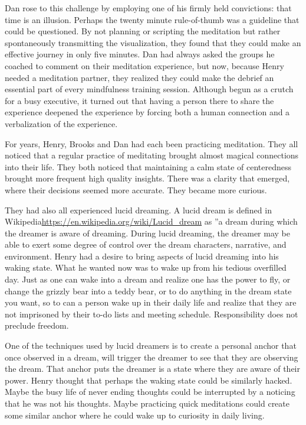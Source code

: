 \documentclass[12pt]{book}
\begin{document}
Dan rose to this challenge by employing one of his firmly held convictions: that time is an illusion. Perhaps the twenty minute rule-of-thumb was a guideline that could be questioned. By not planning or scripting the meditation but rather spontaneously transmitting the visualization, they found that they could make an effective journey in only five minutes. Dan had always asked the groups he coached to comment on their meditation experience, but now, because Henry needed a meditation partner, they realized they could make the debrief an essential part of every mindfulness training session. Although begun as a crutch for a busy executive, it turned out that having a person there to share the experience deepened the experience by forcing both a human connection and a verbalization of the experience.
					
For years,  Henry, Brooks and Dan had each been practicing meditation. They all noticed that a regular practice of meditating brought almost magical connections into their life. They both noticed that maintaining a calm state of centeredness brought more frequent high quality insights. There was a clarity that emerged, where their decisions seemed more accurate. They became more curious.

					
They had also all  experienced lucid dreaming. A lucid dream is defined in Wikipedia\url{https://en.wikipedia.org/wiki/Lucid_dream} as ”a dream during which the dreamer is aware of dreaming. During lucid dreaming, the dreamer may be able to exert some degree of control over the dream characters, narrative, and environment. Henry had a desire to bring aspects of lucid dreaming into his waking state. What he wanted now was to wake up from his tedious overfilled day. Just as one can wake into a dream and realize one has the power to fly, or change the grizzly bear into a teddy bear, or to do anything in the dream state you want, so to can a person wake up in their daily life and realize that they are not imprisoned by their to-do lists and meeting schedule. Responsibility does not preclude freedom.
					
One of the techniques used by lucid dreamers is to create a personal anchor that once observed in a dream, will trigger the dreamer to see that they are observing the dream. That anchor puts the dreamer is a state where they are aware of their power. Henry thought that perhaps the waking state could be similarly hacked. Maybe the busy life of never ending thoughts could be interrupted by a noticing that he was not his thoughts. Maybe practicing quick meditations could create some similar anchor where he could wake up to curiosity in daily living.
					
\end{document}
